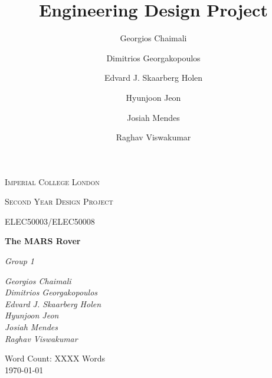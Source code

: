 \documentclass[a4paper]{article}
\title{Engineering Design Project}
\author{Georgios Chaimali \and 
        Dimitrios Georgakopoulos \and 
        Edvard J. Skaarberg Holen \and 
        Hyunjoon Jeon \and 
        Josiah Mendes \and 
        Raghav Viswakumar}
\begin{document}
 
\begin{titlepage}
    \setlength{\headheight}{66.89pt}
    \thispagestyle{fancy}
    \renewcommand{\headrulewidth}{0pt}
    \renewcommand{\footrulewidth}{0pt}
    \cfoot{} %
    \hbox{}\vfill
    \begin{center} 
	    {\scshape\LARGE Imperial College London  \par}
	    \vspace{1cm}
        {\scshape\Large Second Year Design Project\par}
        \vspace{0.25cm}
        {\scshape\Large ELEC50003/ELEC50008\par}
        \vspace{1.5cm}
        {\huge\bfseries The MARS Rover\par}
        \vspace{2cm}
        {\Large\itshape Group 1\par}
        \vfill
        \begin{flushright}
            \textsl{ \large
            Georgios Chaimali \\ 
            Dimitrios Georgakopoulos \\ 
            Edvard J. Skaarberg Holen \\ 
            Hyunjoon Jeon \\ 
            Josiah Mendes \\ 
            Raghav Viswakumar
            }
        \end{flushright}
        \vfill

        {\large Word Count: XXXX Words \\ \today\par}
        \vfill
    \end{center}
\end{titlepage}
 
\setcounter{tocdepth}{2}
\tableofcontents
\end{document}
